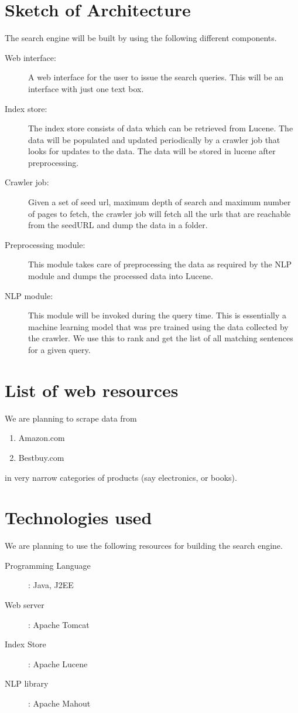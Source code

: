 \documentclass{article}
\begin{document}
\section{Sketch of Architecture}
The search engine will be built by using the following different components.
\begin{description}
  \item[Web interface:] A web interface for the user to issue the search queries.  This will be an interface with just one text box.
  \item[Index store:]  The index store consists of data which can be retrieved from Lucene.  The data will be populated and updated periodically by a crawler job that looks for updates to the data.  The data will be stored in lucene after preprocessing.
  \item[Crawler job:] Given a set of seed url, maximum depth of search and maximum number of pages to fetch, the crawler job will fetch all the urls that are reachable from the seedURL and dump the data in a folder.
  \item[Preprocessing module:]  This module takes care of preprocessing the data as required by the NLP module and dumps the processed data into Lucene.
  \item[NLP module:] This module will be invoked during the query time.  This is essentially a machine learning model that was pre trained using the data collected by the crawler.  We use this to rank and get the list of all matching sentences for a given query.
\end{description}

\section{List of web resources}
We are planning to scrape data from 
\begin{enumerate}
  \item Amazon.com
  \item Bestbuy.com
\end{enumerate}
in very narrow categories of products (say electronics, or books).

\section{Technologies used}
We are planning to use the following resources for building the search engine.
\begin{description}
  \item[Programming Language]: Java, J2EE
  \item[Web server]: Apache Tomcat
  \item[Index Store]: Apache Lucene
  \item[NLP library]: Apache Mahout
\end{description}
\end{document}
